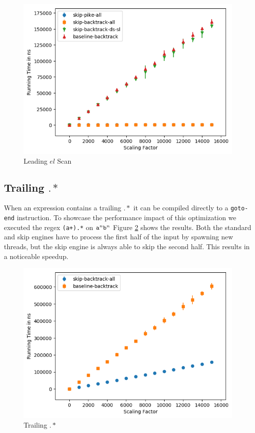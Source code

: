 \begin{figure}
\caption{Leading $el$ Scan}
\label{fig:leading:noncontaining:estar}

\includegraphics{resources/leading-estar.png}
\end{figure}

\subsection{Trailing $.*$}

When an expression contains a trailing $.*$ it can be compiled
directly to a \verb'goto-end' instruction. To showcase the
performance impact of this optimization we executed the
regex \verb'(a+).*' on ${\tt a}^n{\tt b}^n$
Figure \ref{fig:aplus:trailing} shows the results. Both the standard
and skip engines have to process the first half of the input
by spawning new threads, but the skip engine is always able
to skip the second half. This results in a noticeable speedup.

\begin{figure}
\caption{Trailing $.*$}
\label{fig:aplus:trailing}

\includegraphics{resources/aplus-trailing.png}
\end{figure}

